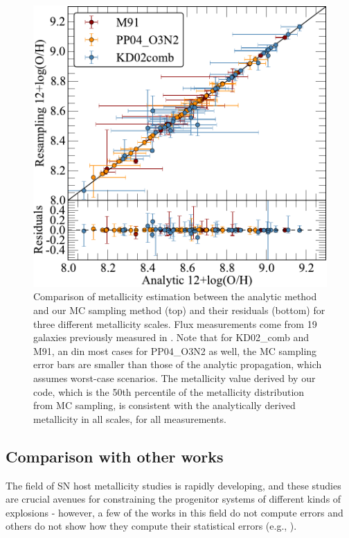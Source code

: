 \documentclass{emulateapj}
\begin{document}
\begin{figure}[ht!]
  \includegraphics[width=1.0\columnwidth]{abcomparison6.pdf}
   \caption{Comparison of metallicity estimation between the analytic method and our MC sampling method (top) and their residuals (bottom) for three different metallicity scales. Flux measurements come from 19 galaxies previously measured in \citet{modjaz11}. 
Note that for KD02\_comb and M91, an din most cases for PP04\_O3N2 as well, the MC sampling error bars are smaller than those of the analytic propagation, which assumes worst-case scenarios. The metallicity value derived by our code, which is the 50th percentile of the metallicity distribution from MC sampling, is consistent with the analytically derived metallicity in all scales, for all measurements.}
 \label{comp_anal_MC}
\end{figure}





\subsection{Comparison with other works}



The field of SN host metallicity studies is rapidly developing, and these studies are crucial avenues for constraining the progenitor systems of different kinds of explosions - however, a few of the works in this field do not compute errors and others do not show how they compute their statistical errors  (e.g., \citealt{anderson10,leloudas11,sanders12,leloudas14}). %
\end{document}
